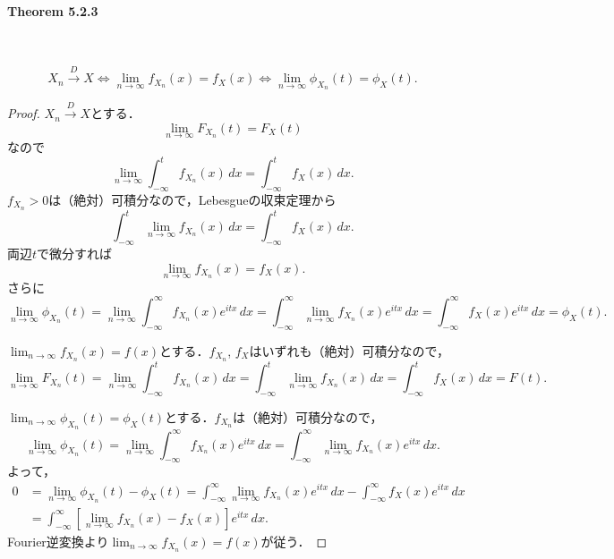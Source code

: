 \paragraph{Theorem 5.2.3}~
\begin{screen}
  \begin{lem}
    \[
      X_n \stackrel{D}{\to} X \Leftrightarrow \lim_{n\to\infty} f_{X_n}(x) = f_X(x) \Leftrightarrow \lim_{n\to\infty} \phi_{X_n}(t) = \phi_X(t) .
    \]
  \end{lem}
\end{screen}
\begin{proof}
  \(X_n \stackrel{D}{\to} X\)とする．
  \[ \lim_{n\to\infty} F_{X_n}(t) = F_X(t) \]
  なので
  \[ \lim_{n\to\infty} \int_{-\infty}^t f_{X_n}(x) \, dx = \int_{-\infty}^t f_X(x) \, dx . \]
  \(f_{X_n} > 0\)は（絶対）可積分なので，Lebesgueの収束定理から
  \[ \int_{-\infty}^t \lim_{n\to\infty} f_{X_n}(x) \, dx = \int_{-\infty}^t f_X(x) \, dx . \]
  両辺\(t\)で微分すれば
  \[ \lim_{n\to\infty} f_{X_n}(x) = f_X(x) . \]
  さらに
  \[
    \lim_{n\to\infty} \phi_{X_n}(t) = \lim_{n\to\infty} \int_{-\infty}^\infty f_{X_n}(x) e^{itx} \, dx
    = \int_{-\infty}^\infty \lim_{n\to\infty} f_{X_n}(x) e^{itx} \, dx
    = \int_{-\infty}^\infty f_X(x) e^{itx} \, dx
    = \phi_X(t) .
  \]

  \(\lim_{n\to\infty} f_{X_n}(x) = f(x)\)とする．\(f_{X_n}\), \(f_X\)はいずれも（絶対）可積分なので，
  \[
    \lim_{n\to\infty} F_{X_n}(t) = \lim_{n\to\infty} \int_{-\infty}^t f_{X_n}(x) \, dx
    = \int_{-\infty}^t \lim_{n\to\infty} f_{X_n}(x) \, dx
    = \int_{-\infty}^t f_X(x) \, dx = F(t) .
  \]

  \(\lim_{n\to\infty} \phi_{X_n}(t) = \phi_X(t)\)とする．\(f_{X_n}\)は（絶対）可積分なので，
  \[
    \lim_{n\to\infty} \phi_{X_n}(t) = \lim_{n\to\infty} \int_{-\infty}^\infty f_{X_n}(x) e^{itx} \, dx
    = \int_{-\infty}^\infty \lim_{n\to\infty} f_{X_n}(x) e^{itx} \, dx .
  \]
  よって，
  \begin{align*}
    0 &= \lim_{n\to\infty} \phi_{X_n}(t) - \phi_X(t) = \int_{-\infty}^\infty \lim_{n\to\infty} f_{X_n}(x) e^{itx} \, dx - \int_{-\infty}^\infty f_X(x) e^{itx} \, dx \\
    &= \int_{-\infty}^\infty \left[ \lim_{n\to\infty} f_{X_n}(x) - f_X(x) \right] e^{itx} \, dx .
  \end{align*}
  Fourier逆変換より\(\lim_{n\to\infty} f_{X_n}(x) = f(x)\)が従う．
\end{proof}

